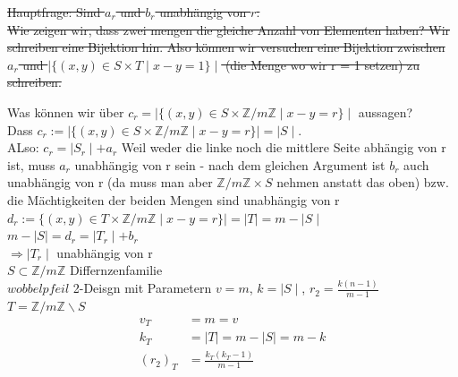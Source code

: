 \documentclass{article} %
\begin{document}
\begin{mybox}
 \sout{Hauptfrage: Sind $a_r$ und $b_r$ unabhängig von $r$.  \\
Wie zeigen wir, dass zwei mengen die gleiche Anzahl von Elementen haben? Wir schreiben eine Bijektion hin. Also können wir versuchen eine Bijektion zwischen $a_r$ und $\mid \{ (x,y) \in S \times T \mid x-y = 1 \} \mid$ (die Menge wo wir r = 1 setzen) zu schreiben. }

Was können wir über $c_r = \mid \{ (x,y) \in S \times \mathbb{Z}/m\mathbb{Z}  \mid x-y = r \} \mid$ aussagen? \\
Dass $c_r := \mid \{ (x,y) \in S \times \mathbb{Z}/m\mathbb{Z}  \mid x-y = r \} \mid = \mid S \mid$. \\
ALso: $c_r = \mid S_r \mid + a_r $ \scriptsize{Weil weder die linke noch die mittlere Seite abhängig von r ist, muss $a_r$ unabhängig von r sein - nach dem gleichen Argument ist $b_r$ auch unabhängig von r (da muss man aber $\mathbb{Z}/m\mathbb{Z} \times S$ nehmen anstatt das oben) bzw. die Mächtigkeiten der beiden Mengen sind unabhängig von r} \normalsize \\
$d_r := \{(x,y) \in T \times \mathbb{Z}/m\mathbb{Z} \mid x-y =r\} \mid  = \mid T \mid = m - \mid S \mid$ \\
$m - \mid S \mid  = d_r = \mid T_r \mid + b_r$ \\
$\Rightarrow  \mid T_r \mid $ unabhängig von r \\ \newline
$S \subset \mathbb{Z}/m\mathbb{Z} $ Differnzenfamilie \\
$wobbelpfeil$ 2-Deisgn mit Parametern $v = m$, $k = \mid S\mid$, $r_2 = \frac{k(n-1)}{m-1}$ \\
$ T = \mathbb{Z}/m\mathbb{Z} \backslash S$ 
\begin{align*}
    v_T & = m = v \\
    k_T & = \mid T \mid  = m - \mid S \mid = m - k \\
    {(r_2)}_T & = \frac{k_T (k_T -1)}{m-1}
\end{align*}
\end{mybox}
\end{document}
